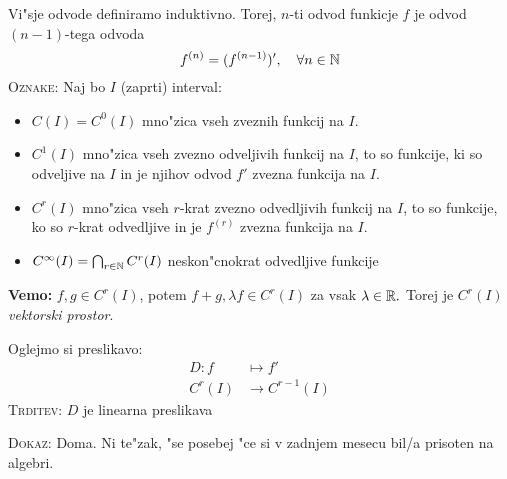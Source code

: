 Vi"sje odvode definiramo induktivno. Torej, $n$-ti odvod funkicje $f$ je odvod $(n-1)$-tega odvoda
\begin{equation*}
f^{(n)} = (f^{(n-1)})', \quad \forall n \in \mathbb{N}
\end{equation*}
%
\textsc{Oznake:} Naj bo $I$ (zaprti) interval:
\begin{itemize}
	\item $C(I) = C^0(I)$ mno"zica vseh zveznih funkcij na $I$.
	\item $C^1(I)$ mno"zica vseh zvezno odveljivih funkcij na $I$, to so funkcije, ki so odveljive na $I$ in je njihov odvod $f'$ zvezna funkcija na $I$.
	\item $C^r(I)$ mno"zica vseh $r$-krat zvezno odvedljivih funkcij na $I$, to so funkcije, ko so $r$-krat odvedljive in je $f^{(r)}$ zvezna funkcija na $I$.
	\item $C^\infty(I) = \bigcap_{r \in \mathbb{N}}C^r(I)$ neskon"cnokrat odvedljive funkcije
\end{itemize}
\textbf{Vemo:} $f, g \in C^r(I)$, potem $f+g, \lambda f \in C^r(I)$ za vsak $\lambda \in \mathbb{R}.$ Torej je $C^r(I)$ \emph{vektorski prostor}.

Oglejmo si preslikavo:
\begin{align*}
D: f &\mapsto f' \\
C^r(I) &\to C^{r-1}(I)
\end{align*}
%
\textsc{Trditev:} $D$ je linearna preslikava

\textsc{Dokaz:} Doma. Ni te"zak, "se posebej "ce si v zadnjem mesecu bil/a prisoten na algebri.

